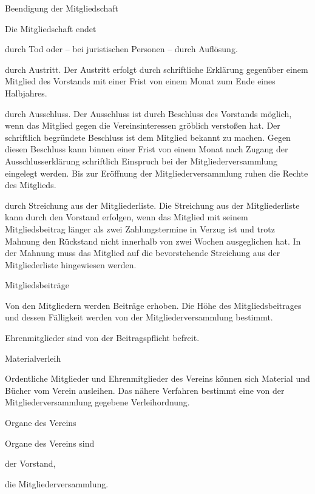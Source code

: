 \documentclass[11pt,a4paper,twoside,openany,article]{memoir}
\begin{document}
\begin{para}{Beendigung der Mitgliedschaft}
	\label{p:mitgliedschaftende}
	\item Die Mitgliedschaft endet
	\begin{subpara}
	\item durch Tod oder – bei juristischen Personen – durch Auflösung.
	\item durch Austritt.
	Der Austritt erfolgt durch schriftliche Erklärung gegenüber einem Mitglied des Vorstands mit einer Frist von einem Monat zum Ende eines Halbjahres.
	\item durch Ausschluss.
	Der Ausschluss ist durch Beschluss des Vorstands möglich, wenn das Mitglied gegen die Vereinsinteressen gröblich verstoßen hat. Der schriftlich begründete Beschluss ist dem Mitglied bekannt zu machen.
	Gegen diesen Beschluss kann binnen einer Frist von einem Monat nach Zugang der Ausschlusserklärung schriftlich Einspruch bei der Mitgliederversammlung eingelegt werden. Bis zur Eröffnung der Mitgliederversammlung ruhen die Rechte des Mitglieds.
	\item durch Streichung aus der Mitgliederliste.
	Die Streichung aus der Mitgliederliste kann durch den Vorstand erfolgen, wenn das Mitglied mit seinem Mitgliedsbeitrag länger als zwei Zahlungstermine in Verzug ist und trotz Mahnung den Rückstand nicht innerhalb von zwei Wochen ausgeglichen hat. In der Mahnung muss das Mitglied auf die bevorstehende Streichung aus der Mitgliederliste hingewiesen werden.
	\end{subpara}
\end{para}

\begin{para}{Mitgliedsbeiträge}
	\label{p:mitgliedsbeiträge}
	\item Von den Mitgliedern werden Beiträge erhoben. Die Höhe des Mitgliedsbeitrages und dessen Fälligkeit werden von der Mitgliederversammlung bestimmt.
	\item Ehrenmitglieder sind von der Beitragspflicht befreit.
\end{para}

\begin{para}{Materialverleih}
	\label{p:materialverleih}
	\item Ordentliche Mitglieder und Ehrenmitglieder des Vereins können sich Material und Bücher vom Verein ausleihen. Das nähere Verfahren bestimmt eine von der Mitgliederversammlung gegebene Verleihordnung.
\end{para}

\begin{para}{Organe des Vereins}
\label{p:organe}
\item Organe des Vereins sind
	\begin{subpara}
	\item der Vorstand,
	\item die Mitgliederversammlung.
	\end{subpara}
\end{para}
\end{document}
